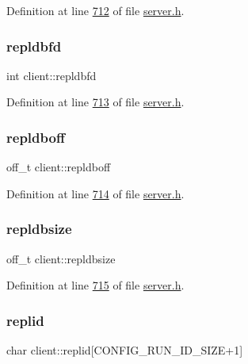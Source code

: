 Definition at line \hyperlink{server_8h_source_l00712}{712} of file \hyperlink{server_8h_source}{server.\+h}.

\mbox{\label{structclient_af49fbae3663be5fb9cec9abc3e266185}} 
\subsubsection{\texorpdfstring{repldbfd}{repldbfd}}
{\footnotesize\ttfamily int client\+::repldbfd}



Definition at line \hyperlink{server_8h_source_l00713}{713} of file \hyperlink{server_8h_source}{server.\+h}.

\mbox{\label{structclient_a63eb4a4b1e825830c07541c922f0e293}} 
\subsubsection{\texorpdfstring{repldboff}{repldboff}}
{\footnotesize\ttfamily off\+\_\+t client\+::repldboff}



Definition at line \hyperlink{server_8h_source_l00714}{714} of file \hyperlink{server_8h_source}{server.\+h}.

\mbox{\label{structclient_ad81cd83aadbb4e074164fd87f1aeccbd}} 
\subsubsection{\texorpdfstring{repldbsize}{repldbsize}}
{\footnotesize\ttfamily off\+\_\+t client\+::repldbsize}



Definition at line \hyperlink{server_8h_source_l00715}{715} of file \hyperlink{server_8h_source}{server.\+h}.

\mbox{\label{structclient_ac7f4047dc671efda5cb77c1708d925ba}} 
\subsubsection{\texorpdfstring{replid}{replid}}
{\footnotesize\ttfamily char client\+::replid\mbox{[}C\+O\+N\+F\+I\+G\+\_\+\+R\+U\+N\+\_\+\+I\+D\+\_\+\+S\+I\+ZE+1\mbox{]}}



